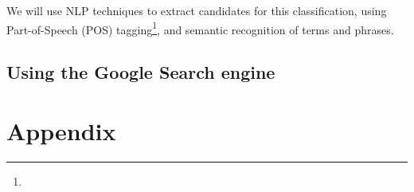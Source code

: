 \documentclass[10pt,letterpaper,draft]{article}
\begin{document}
We will use NLP techniques to extract candidates for this
classification, using Part-of-Speech (POS)
tagging\footnote{}, and semantic
recognition of terms and phrases.





\subsection{Using the Google Search engine}





\appendix
\section{Appendix}

\renewcommand\bibname{References}


\end{document}
